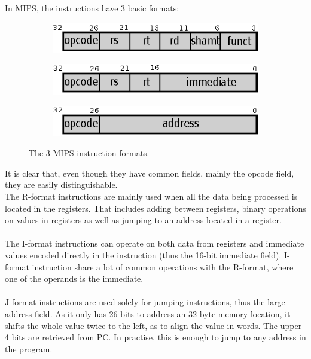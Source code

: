 In MIPS, the instructions have 3 basic formats:
\begin{figure}[H]

\begin{subfigure}[b]{0.6\textwidth}
	\includegraphics{cpu_architecture/r_format.eps}
	\label{fig:instruction_r_format}
\end{subfigure}

\begin{subfigure}[b]{0.6\textwidth}
	\includegraphics{cpu_architecture/i_format.eps}
	\label{fig:instruction_i_format}
\end{subfigure}

\begin{subfigure}[b]{0.6\textwidth}
	\includegraphics{cpu_architecture/j_format.eps}
	\label{fig:instruction_j_format}
\end{subfigure}

\caption{The 3 MIPS instruction formats.}
\label{fig:instruction_formats}
\end{figure}

It is clear that, even though they have common fields, mainly the opcode field,
they are
easily distinguishable.\\
The R-format instructions are mainly used when all the data being processed is
located in the registers. That includes adding between registers, binary
operations on values in registers as well as jumping to an address located in
a register.\\\\
The I-format instructions can operate on both data from registers and
immediate
values encoded directly in the instruction (thus the 16-bit immediate field).
I-format instruction share a lot of common operations with the R-format, where
one of the operands is the immediate.\\\\
J-format instructions are used solely for jumping instructions, thus the large
address field. As it only has 26 bits to address an 32 byte memory location, it
shifts the whole value twice to the left, as to align the value in words. The
upper 4 bits are retrieved from PC. In practise, this is enough to jump to any
address in the program.

